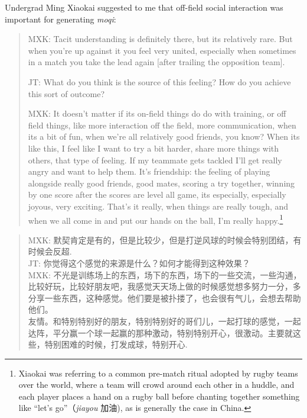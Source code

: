 \begin{CJK}{UTF8}{gbsn}
Undergrad Ming Xiaokai suggested to me that off-field social interaction was important for generating \textit{moqi}:

    \begin{quote}
        MXK: Tacit understanding is definitely there, but its relatively rare. But when you’re up against it you feel very united, especially when sometimes in a match you take the lead again [after trailing the opposition team].

        JT: What do you think is the source of this feeling?  How do you achieve this sort of outcome?

        MXK: It doesn’t matter if its on-field things do do with training, or off field things, like more interaction off the field, more communication, when its a bit of fun, when we're all relatively good friends, you know?  When its like this, I feel like I want to try a bit harder, share more things with others, that type of feeling.  If my teammate gets tackled I'll get really angry and want to help them.  It's friendship: the feeling of playing alongside really good friends, good mates, scoring a try together, winning by one score after the scores are level all game, its especially, especially joyous, very exciting.  That's it really, when things are really tough, and when we all come in and put our hands on the ball, I’m really happy.\footnote{Xiaokai was referring to a common pre-match ritual adopted by rugby teams over the world, where a team will crowd around each other in a huddle, and each player places a hand on a rugby ball before chanting together something like ``let's go''（\textit{jiayou} 加油), as is generally the case in China.}
    \end{quote}

    \begin{quote}
        MXK: 默契肯定是有的，但是比较少，但是打逆风球的时候会特别团结，有时候会反超. \\
        JT: 你觉得这个感觉的来源是什么？如何才能得到这种效果？\\
        MXK: 不光是训练场上的东西，场下的东西，场下的一些交流，一些沟通，比较好玩，比较好朋友吧，我感觉天天场上做的时候感觉想多努力一分，多分享一些东西，这种感觉。他们要是被扑搂了，也会很有气儿，会想去帮助他们。 \\

友情。和特别特别好的朋友，特别特别好的哥们儿，一起打球的感觉，一起达阵，平分赢一个球一起赢的那种激动，特别特别开心，很激动。主要就这些，特别困难的时候，打发成球，特别开心.
    \end{quote}


\end{CJK}
